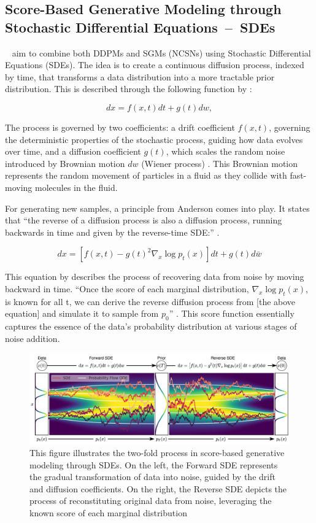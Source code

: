 \subsection{Score-Based Generative Modeling through Stochastic Differential Equations~--~SDEs}\label{SDEs}

~\citeauthor{song2020score} aim to combine both DDPMs and SGMs (NCSNs) using Stochastic Differential Equations (SDEs). The idea is to create a continuous diffusion process, indexed by time, that transforms a data distribution into a more tractable prior distribution. This is described through the following function by \citeauthor{song2020score}:

\[ dx = f(x, t)dt + g(t)dw, \]

The process is governed by two coefficients: a drift coefficient \( f(x, t) \), governing the deterministic properties of the stochastic process, guiding how data evolves over time, and a diffusion coefficient \( g(t) \), which scales the random noise introduced by Brownian motion \( dw \) (Wiener process) \citep{song2020score}. This Brownian motion represents the random movement of particles in a fluid as they collide with fast-moving molecules in the fluid. 


For generating new samples, a  principle from Anderson \citep{anderson1982313} comes into play. It states that ``the reverse of a diffusion process is also a diffusion process, running backwards in time and given by the reverse-time SDE:\@'' \citep{song2020score}.

\[ dx = \left[ f(x, t) - g{(t)}^2 \nabla_x \log p_t(x) \right] dt + g(t)d\bar{w} \]

This equation by \citeauthor{song2020score} describes the process of recovering data from noise by moving backward in time. ``Once the score of each marginal distribution, \(\nabla_x \log p_t(x) \), is known for all t, we can derive the reverse diffusion process from [the above equation] and simulate it to sample from \(p_0\)'' \citep{song2019SGM}. This score function essentially captures the essence of the data's probability distribution at various stages of noise addition.

\begin{figure}[ht]
  \centering
    \includegraphics[width=1\columnwidth]{figures/DiffusionModels_SDEs.png}
    \caption{This figure illustrates the two-fold process in score-based generative modeling through SDEs. On the left, the Forward SDE represents the gradual transformation of data into noise, guided by the drift and diffusion coefficients. On the right, the Reverse SDE depicts the process of reconstituting original data from noise, leveraging the known score of each marginal distribution~\citep{song2020score}}\label{fig:DM_SDEs}
\end{figure}

